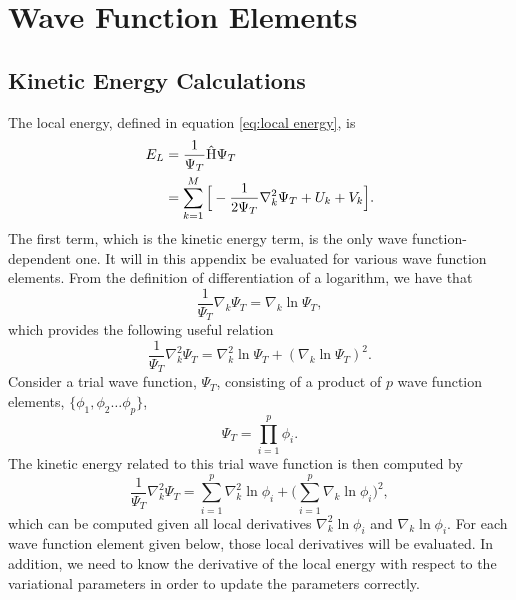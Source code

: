 \chapter{Wave Function Elements} \label{chp:appendixd}

\section{Kinetic Energy Calculations}
The local energy, defined in equation \eqref{eq:local energy}, is
\begin{align}
E_L &=\frac{1}{\Psi_T}\hat{\text{H}}\Psi_T\\
&=\sum_{k=1}^M\Big[-\frac{1}{2\Psi_T}\nabla_k^2\Psi_T + U_k + V_k\Big].
\end{align}
The first term, which is the kinetic energy term, is the only wave function-dependent one. It will in this appendix be evaluated for various wave function elements. From the definition of differentiation of a logarithm, we have that
\begin{equation}
\frac{1}{\Psi_T}\nabla_k\Psi_T=\nabla_k\ln\Psi_T,
\end{equation}
which provides the following useful relation 
\begin{equation}
\frac{1}{\Psi_T}\nabla_k^2\Psi_T=\nabla_k^2\ln\Psi_T + (\nabla_k\ln\Psi_T)^2.
\end{equation}
Consider a trial wave function, $\Psi_T$, consisting of a product of $p$ wave function elements, $\{\phi_1, \phi_2\hdots\phi_p\}$,
\begin{equation}
\Psi_T = \prod_{i=1}^p\phi_i.
\end{equation}
The kinetic energy related to this trial wave function is then computed by
\begin{equation}
\frac{1}{\Psi_T}\nabla_k^2\Psi_T=\sum_{i=1}^p\nabla_k^2\ln\phi_i + \Big(\sum_{i=1}^p\nabla_k\ln\phi_i\Big)^2,
\end{equation}
which can be computed given all local derivatives $\nabla_k^2\ln\phi_i$ and $\nabla_k\ln\phi_i$. For each wave function element given below, those local derivatives will be evaluated. In addition, we need to know the derivative of the local energy with respect to the variational parameters in order to update the parameters correctly. 

